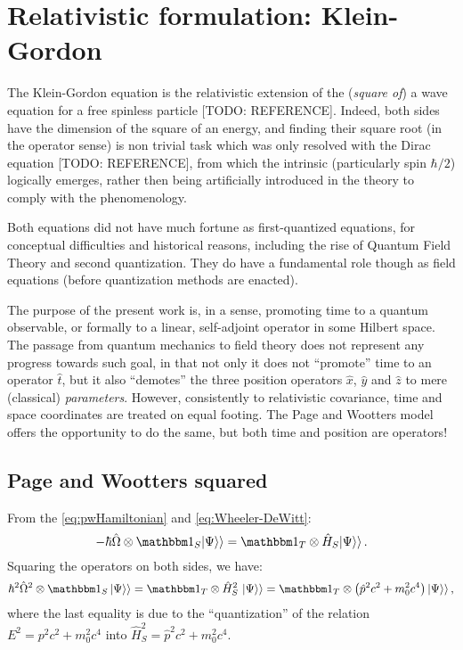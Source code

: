 \section{Relativistic formulation: Klein-Gordon}

The Klein-Gordon equation is the relativistic extension of the
(\emph{square of}) a wave equation for a free spinless particle
[TODO: REFERENCE]. Indeed, both sides have the dimension of
the square of an energy, and finding their square root
(in the operator sense) is non trivial task which was only resolved 
with the Dirac equation [TODO: REFERENCE], from which the
intrinsic  (particularly spin $\hbar/2$) logically emerges,
rather then being artificially introduced in the theory
to comply with the phenomenology.

Both equations did not have much fortune as first-quantized equations,
for conceptual difficulties and historical reasons, including the rise
of Quantum Field Theory and second quantization. They do have a fundamental
role though as field equations (before quantization methods are enacted).

The purpose of the present work is, in a sense, promoting time to a quantum
observable, or formally to a linear, self-adjoint operator in some Hilbert space.
The passage from quantum mechanics to field theory does not represent any progress
towards such goal, in that not only it does not ``promote'' time to an operator $\hat{t}$,
but it also ``demotes'' the three position operators $\hat{x}$, $\hat{y}$ and $\hat{z}$
to mere (classical) \emph{parameters}. However, consistently to relativistic covariance,
time and space coordinates are treated on equal footing. The Page and Wootters model
offers the opportunity to do the same, but both time and position are operators!

\subsection{Page and Wootters squared}

From the \eqref{eq:pwHamiltonian} and \eqref{eq:Wheeler-DeWitt}:
\begin{equation}\label{eq:pw_to_be_squared}
  -\hbar\hat{\Omega}\ox\idop_S \dket{\Psi} = \idop_T\ox\hat{H}_S \dket{\Psi} \,\text{.}
\end{equation}
Squaring the operators on both sides, we have:
\begin{equation}\label{eq:pw_squared}
  \hbar^{2}\hat{\Omega}^{2}\ox\idop_S \, \dket{\Psi} = \idop_T\ox\hat{H}_S^{2} \,\, \dket{\Psi} 
    = \idop_T \ox \left( \hat{p}^2 c^2 + m_0^2 c^4 \right) \dket{\Psi} \,\text{,}
\end{equation}
where the last equality is due to the ``quantization'' of the relation $E^2 = p^2 c^2 + m_0^2 c^4$
into $\hat{H}_S^{2} = \hat{p}^2 c^2 + m_0^2 c^4$.

